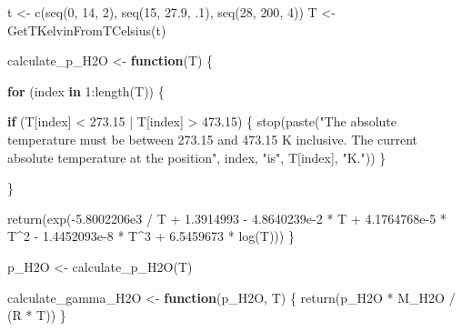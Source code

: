 \documentclass[
  12pt,
  a4paper,
  onecolumn, twoside]{article}
\newenvironment{Shaded}{\begin{snugshade}}{\end{snugshade}}
\newcommand{\ControlFlowTok}[1]{\textcolor[rgb]{0.13,0.29,0.53}{\textbf{#1}}}
\newcommand{\DecValTok}[1]{\textcolor[rgb]{0.00,0.00,0.81}{#1}}
\newcommand{\FloatTok}[1]{\textcolor[rgb]{0.00,0.00,0.81}{#1}}
\newcommand{\FunctionTok}[1]{\textcolor[rgb]{0.00,0.00,0.00}{#1}}
\newcommand{\NormalTok}[1]{#1}
\newcommand{\OtherTok}[1]{\textcolor[rgb]{0.56,0.35,0.01}{#1}}
\newcommand{\SpecialCharTok}[1]{\textcolor[rgb]{0.00,0.00,0.00}{#1}}
\newcommand{\StringTok}[1]{\textcolor[rgb]{0.31,0.60,0.02}{#1}}
\begin{document}
\begin{Shaded}
\begin{Highlighting}[numbers=left,,]
\NormalTok{t }\OtherTok{\textless{}{-}} \FunctionTok{c}\NormalTok{(}\FunctionTok{seq}\NormalTok{(}\DecValTok{0}\NormalTok{, }\DecValTok{14}\NormalTok{, }\DecValTok{2}\NormalTok{), }\FunctionTok{seq}\NormalTok{(}\DecValTok{15}\NormalTok{, }\FloatTok{27.9}\NormalTok{, .}\DecValTok{1}\NormalTok{), }\FunctionTok{seq}\NormalTok{(}\DecValTok{28}\NormalTok{, }\DecValTok{200}\NormalTok{, }\DecValTok{4}\NormalTok{))}
\NormalTok{T }\OtherTok{\textless{}{-}} \FunctionTok{GetTKelvinFromTCelsius}\NormalTok{(t)}

\NormalTok{calculate\_p\_H2O }\OtherTok{\textless{}{-}} \ControlFlowTok{function}\NormalTok{(T) \{}
  
  \ControlFlowTok{for}\NormalTok{ (index }\ControlFlowTok{in} \DecValTok{1}\SpecialCharTok{:}\FunctionTok{length}\NormalTok{(T)) \{}
  
    \ControlFlowTok{if}\NormalTok{ (T[index] }\SpecialCharTok{\textless{}} \FloatTok{273.15} \SpecialCharTok{|}\NormalTok{ T[index] }\SpecialCharTok{\textgreater{}} \FloatTok{473.15}\NormalTok{) \{}
      \FunctionTok{stop}\NormalTok{(}\FunctionTok{paste}\NormalTok{(}\StringTok{"The absolute temperature must be between 273.15 and 473.15 K inclusive. The current absolute temperature at the position"}\NormalTok{, index, }\StringTok{"is"}\NormalTok{, T[index], }\StringTok{"K."}\NormalTok{))}
\NormalTok{    \}}
    
\NormalTok{  \}}
  
  \FunctionTok{return}\NormalTok{(}\FunctionTok{exp}\NormalTok{(}\SpecialCharTok{{-}}\FloatTok{5.8002206e3} \SpecialCharTok{/}\NormalTok{ T }\SpecialCharTok{+} \FloatTok{1.3914993} \SpecialCharTok{{-}} \FloatTok{4.8640239e{-}2} \SpecialCharTok{*}\NormalTok{ T }\SpecialCharTok{+} \FloatTok{4.1764768e{-}5} \SpecialCharTok{*}\NormalTok{ T}\SpecialCharTok{\^{}}\DecValTok{2} \SpecialCharTok{{-}} \FloatTok{1.4452093e{-}8} \SpecialCharTok{*}\NormalTok{ T}\SpecialCharTok{\^{}}\DecValTok{3} \SpecialCharTok{+} \FloatTok{6.5459673} \SpecialCharTok{*} \FunctionTok{log}\NormalTok{(T)))}
\NormalTok{\}}

\NormalTok{p\_H2O }\OtherTok{\textless{}{-}} \FunctionTok{calculate\_p\_H2O}\NormalTok{(T)}

\NormalTok{calculate\_gamma\_H2O }\OtherTok{\textless{}{-}} \ControlFlowTok{function}\NormalTok{(p\_H2O, T) \{}
  \FunctionTok{return}\NormalTok{(p\_H2O }\SpecialCharTok{*}\NormalTok{ M\_H2O }\SpecialCharTok{/}\NormalTok{ (R }\SpecialCharTok{*}\NormalTok{ T))}
\NormalTok{\}}


\end{Highlighting}
\end{Shaded}
\end{document}
